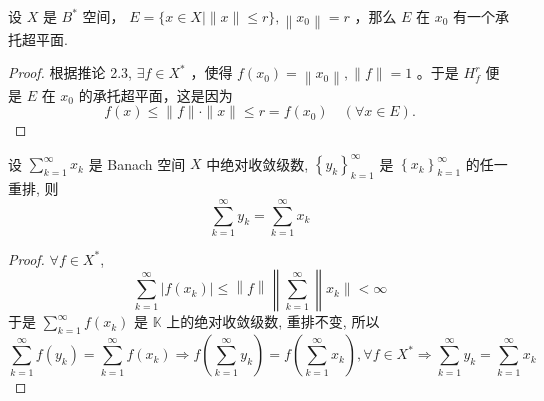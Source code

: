 \documentclass[lang=cn,newtx,10pt,scheme=chinese,thmcnt=chapter]{elegantbook}
\begin{document}
\begin{example}
 设 $X$ 是 $B^*$ 空间， $E=\{x \in X \mid\|x\| \leqslant r\},\left\|x_0\right\|=r$ ，那么 $E$ 在 $x_0$ 有一个承托超平面.


\end{example}

\begin{proof}
根据推论 2.3, $\exists f \in X ^*$ ，使得 $f\left(x_0\right)=\left\|x_0\right\|,\|f\|=1$ 。于是 $H_f^r$ 便是 $E$ 在 $x_0$ 的承托超平面，这是因为
\begin{equation*}
f(x) \leqslant\|f\| \cdot\|x\| \leqslant r=f\left(x_0\right) \quad(\forall x \in E) .
\end{equation*}

\end{proof}
\begin{example}

设 $\sum_{k=1}^{\infty} x_k$ 是 Banach 空间 $X$ 中绝对收敛级数, $\left\{y_k\right\}_{k=1}^{\infty}$ 是 $\left\{x_k\right\}_{k=1}^{\infty}$ 的任一重排, 则
\begin{equation*}
\sum_{k=1}^{\infty} y_k=\sum_{k=1}^{\infty} x_k
\end{equation*}



\end{example}
\begin{proof}
 $\forall f \in X^*$,
\begin{equation*}
\sum_{k=1}^{\infty}\left|f\left(x_k\right)\right| \leqslant\left\|f\right\| \left\| \sum_{k=1}^{\infty}\right\| x_k \|<\infty
\end{equation*}
于是 $\sum_{k=1}^{\infty} f\left(x_k\right)$ 是 $\mathbb{K}$ 上的绝对收敛级数, 重排不变, 所以
\begin{equation*}
\sum_{k=1}^{\infty} f\left(y_k\right)=\sum_{k=1}^{\infty} f\left(x_k\right) \Rightarrow f\left(\sum_{k=1}^{\infty} y_k\right)=f\left(\sum_{k=1}^{\infty} x_k\right), \forall f \in X^* {\Rightarrow} \sum_{k=1}^{\infty} y_k=\sum_{k=1}^{\infty} x_k
\end{equation*}

\end{proof}
\end{document}
